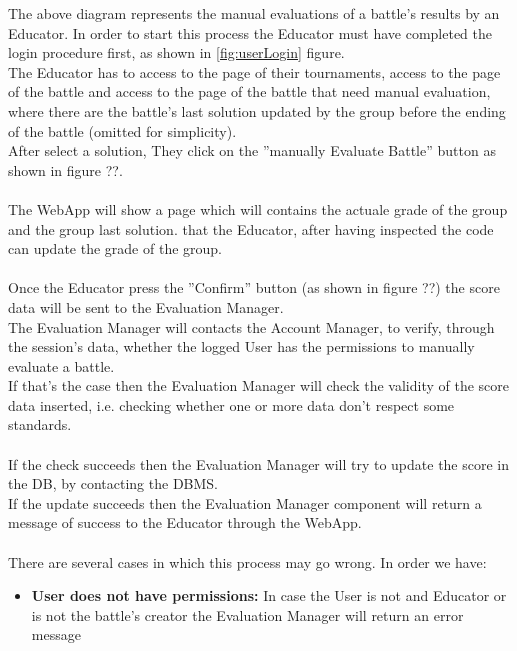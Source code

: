 \documentclass{article}
\begin{document}
{        \newpage
        The above diagram represents the manual evaluations of a battle’s results by an Educator.
        In order to start this process the Educator must have completed the login procedure first, as shown in \ref{fig:userLogin}
        figure.\\ 
        The Educator has to access to the page of their tournaments, access to the page of the battle and access to the page 
        of the battle that need manual evaluation, where there are the battle's last solution updated by the group before 
        the ending of the battle (omitted for simplicity).\\
        After select a solution, They click on the ”manually Evaluate Battle” button as shown in figure ??.\\
        \\
        The WebApp will show a page which will contains the actuale grade of the group and the group last solution.
        that the Educator, after having inspected the code can update the grade of the group.
        \\ \\
        Once the Educator press the ”Confirm” button (as shown in figure ??) the score data will be sent to the Evaluation Manager.\\
        The Evaluation Manager will contacts the Account Manager, to verify, through
        the session’s data, whether the logged User has the permissions to manually
        evaluate a battle.\\ If that’s the case then the Evaluation Manager will
        check the validity of the score data inserted, i.e. checking whether one or
        more data don’t respect some standards.\\
        \\
        If the check succeeds then the Evaluation Manager will try to update the score
        in the DB, by contacting the DBMS.\\
        If the update succeeds then the Evaluation Manager component will return a message
        of success to the Educator through the WebApp.
        \\ \\
        There are several cases in which this process may go wrong. In order we have:
        \begin{itemize}
            \item \textbf{User does not have permissions:} In case the User is not and Educator
            or is not the battle’s creator the Evaluation Manager will return an error message 

\end{itemize}}
\end{document}

